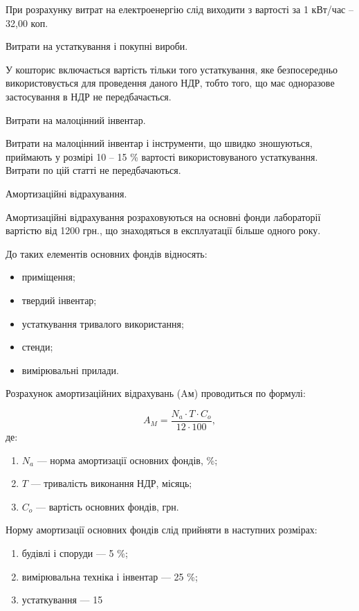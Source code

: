 При розрахунку витрат на електроенергію слід виходити з вартості за 1 кВт/час – 32,00 коп.

Витрати на устаткування і покупні вироби. 

У кошторис включається вартість тільки того устаткування, яке безпосередньо використовується для проведення даного НДР, тобто того, що має одноразове застосування в НДР не передбачається.

Витрати на малоцінний інвентар. 

Витрати на малоцінний інвентар і інструменти, що швидко зношуються, приймають у розмірі 10 – 15 \% вартості використовуваного устаткування. Витрати по цій статті не передбачаються.

Амортизаційні відрахування.

Амортизаційні відрахування розраховуються на основні фонди лабораторії вартістю від 1200 грн., що знаходяться в експлуатації більше одного року.

До таких елементів основних фондів відносять:
\begin{itemize}
\item приміщення;
\item твердий інвентар;
\item устаткування тривалого використання;
\item стенди;
\item вимірювальні прилади.
\end{itemize}

Розрахунок амортизаційних відрахувань (Aм) проводиться по формулі:

\begin{equation}
A_M = \frac{N_a   \cdot   T   \cdot   C_o}{12  \cdot  100}, \nonumber
\end{equation}
де:
\begin{enumerate}
\item $N_a$ --- норма амортизації основних фондів, \%;
\item $T$ --- тривалість виконання НДР, місяць;
\item $C_o$ --- вартість основних фондів, грн.
\end{enumerate}

Норму амортизації основних фондів слід прийняти в наступних розмірах:

\begin{enumerate}
\item будівлі і споруди --- 5 \%;
\item вимірювальна техніка і інвентар --- 25 \%;
\item устаткування --- 15 %
\end{enumerate}

